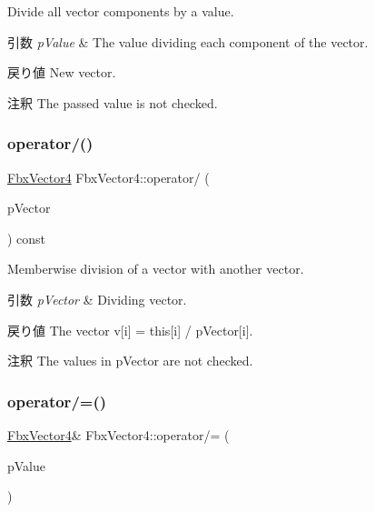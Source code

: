 Divide all vector components by a value. 
\begin{DoxyParams}{引数}
{\em p\+Value} & The value dividing each component of the vector. \\
\hline
\end{DoxyParams}
\begin{DoxyReturn}{戻り値}
New vector. 
\end{DoxyReturn}
\begin{DoxyRemark}{注釈}
The passed value is not checked. 
\end{DoxyRemark}
\mbox{\label{class_fbx_vector4_ad1477f8303d7649b10864ba8c721309c}} 
\subsubsection{\texorpdfstring{operator/()}{operator/()}\hspace{0.1cm}{\footnotesize\ttfamily [2/2]}}
{\footnotesize\ttfamily \hyperlink{class_fbx_vector4}{Fbx\+Vector4} Fbx\+Vector4\+::operator/ (\begin{DoxyParamCaption}\item[{const \hyperlink{class_fbx_vector4}{Fbx\+Vector4} \&}]{p\+Vector }\end{DoxyParamCaption}) const}

Memberwise division of a vector with another vector. 
\begin{DoxyParams}{引数}
{\em p\+Vector} & Dividing vector. \\
\hline
\end{DoxyParams}
\begin{DoxyReturn}{戻り値}
The vector v\mbox{[}i\mbox{]}\textquotesingle{} = this\mbox{[}i\mbox{]} / p\+Vector\mbox{[}i\mbox{]}. 
\end{DoxyReturn}
\begin{DoxyRemark}{注釈}
The values in p\+Vector are not checked. 
\end{DoxyRemark}
\mbox{\label{class_fbx_vector4_a70953f7aa47d51868a3a9020a982b749}} 
\subsubsection{\texorpdfstring{operator/=()}{operator/=()}\hspace{0.1cm}{\footnotesize\ttfamily [1/2]}}
{\footnotesize\ttfamily \hyperlink{class_fbx_vector4}{Fbx\+Vector4}\& Fbx\+Vector4\+::operator/= (\begin{DoxyParamCaption}\item[{double}]{p\+Value }\end{DoxyParamCaption})}

